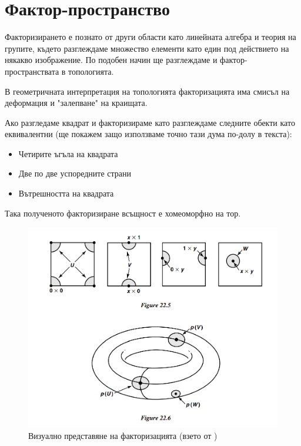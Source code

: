 \section{Фактор-пространство}
Факторизирането е познато от други области като линейната алгебра и теория на групите, където разглеждаме множество елементи като един под действието на някакво изображение. По подобен начин ще разглеждаме и фактор-пространствата в топологията.

В геометричната интерпретация на топологията факторизацията има смисъл на деформация и "залепване" на краищата.

\begin{example}
    Ако разгледаме квадрат и факторизираме като разглеждаме следните обекти като еквивалентни (ще покажем защо използваме точно тази дума по-долу в текста):

    \begin{itemize}
        \item Четирите ъгъла на квадрата
        \item Две по две успоредните страни
        \item Вътрешността на квадрата
    \end{itemize}

    Така полученото факторизиране всъщност е хомеоморфно на тор.
    \begin{figure}[H]
        \centering
        \includegraphics[width=\textwidth]{resources/torus.png}
        \caption{Визуално представяне на факторизацията (взето от \cite[стр.~140]{munkrestopology})}
    \end{figure}
\end{example}

